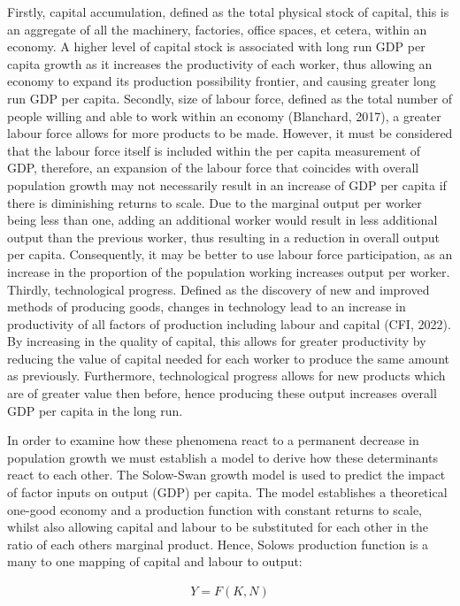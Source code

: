 \documentclass[
]{article}
\begin{document}
Firstly, capital accumulation, defined as the total physical stock of
capital, this is an aggregate of all the machinery, factories, office
spaces, et cetera, within an economy. A higher level of capital stock is
associated with long run GDP per capita growth as it increases the
productivity of each worker, thus allowing an economy to expand its
production possibility frontier, and causing greater long run GDP per
capita. Secondly, size of labour force, defined as the total number of
people willing and able to work within an economy (Blanchard, 2017), a
greater labour force allows for more products to be made. However, it
must be considered that the labour force itself is included within the
per capita measurement of GDP, therefore, an expansion of the labour
force that coincides with overall population growth may not necessarily
result in an increase of GDP per capita if there is diminishing returns
to scale. Due to the marginal output per worker being less than one,
adding an additional worker would result in less additional output than
the previous worker, thus resulting in a reduction in overall output per
capita. Consequently, it may be better to use labour force
participation, as an increase in the proportion of the population
working increases output per worker. Thirdly, technological progress.
Defined as the discovery of new and improved methods of producing goods,
changes in technology lead to an increase in productivity of all factors
of production including labour and capital (CFI, 2022). By increasing in
the quality of capital, this allows for greater productivity by reducing
the value of capital needed for each worker to produce the same amount
as previously. Furthermore, technological progress allows for new
products which are of greater value then before, hence producing these
output increases overall GDP per capita in the long run.

In order to examine how these phenomena react to a permanent decrease in
population growth we must establish a model to derive how these
determinants react to each other. The Solow-Swan growth model is used to
predict the impact of factor inputs on output (GDP) per capita. The
model establishes a theoretical one-good economy and a production
function with constant returns to scale, whilst also allowing capital
and labour to be substituted for each other in the ratio of each others
marginal product. Hence, Solow\textquotesingle s production function is
a many to one mapping of capital and labour to output:

{\[\begin{matrix}
{Y = F(K,N)} \\
\end{matrix}\]}
\end{document}
